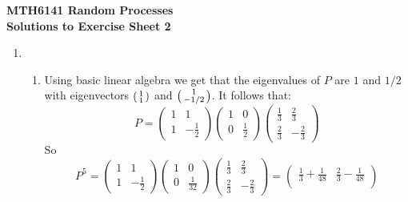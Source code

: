 \documentclass[11pt,a4paper]{report}
\newenvironment{psmallmatrix}
  {\left(\begin{smallmatrix}}
  {\end{smallmatrix}\right)}
\begin{document}
    \textbf{MTH6141 Random Processes}\\
    \textbf{Solutions to Exercise Sheet 2}

    \begin{enumerate}
        \item 
        \begin{enumerate}
            \item Using basic linear algebra we get that the eigenvalues of $P$ are $1$ and $1/2$ with eigenvectors $\begin{psmallmatrix}1 \\ 1\end{psmallmatrix}$ and $\begin{psmallmatrix}1 \\ -1/2\end{psmallmatrix}$. It follows that:
            \[P = \begin{pmatrix}
                1 & 1 \\
                1 & -\frac{1}{2}
            \end{pmatrix}
            \begin{pmatrix}
                1 & 0 \\
                0 & \frac{1}{2}
            \end{pmatrix}
            \begin{pmatrix}
                \frac{1}{3} & \frac{2}{3} \\
                \frac{2}{3} & -\frac{2}{3}
            \end{pmatrix}\]
            So
            \[P^5 = \begin{pmatrix}
                1 & 1 \\
                1 & -\frac{1}{2}
            \end{pmatrix}
            \begin{pmatrix}
                1 & 0 \\
                0 & \frac{1}{32}
            \end{pmatrix}
            \begin{pmatrix}
                \frac{1}{3} & \frac{2}{3} \\
                \frac{2}{3} & -\frac{2}{3}
            \end{pmatrix}
            =
            \begin{pmatrix}
                \frac{1}{3}+\frac{1}{48} & \frac{2}{3}-\frac{1}{48} \\

\end{pmatrix}\]
\end{enumerate}
\end{enumerate}
\end{document}
